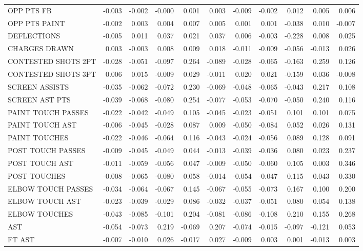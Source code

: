 \begin{tabular}{lrrrrrrrrrr}
OPP PTS FB & -0.003 & -0.002 & -0.000 & 0.001 & 0.003 & -0.009 & -0.002 & 0.012 & 0.005 & 0.006 \\
OPP PTS PAINT & -0.002 & 0.003 & 0.004 & 0.007 & 0.005 & 0.001 & 0.001 & -0.038 & 0.010 & -0.007 \\
DEFLECTIONS & -0.005 & 0.011 & 0.037 & 0.021 & 0.037 & 0.006 & -0.003 & -0.228 & 0.008 & 0.025 \\
CHARGES DRAWN & 0.003 & -0.003 & 0.008 & 0.009 & 0.018 & -0.011 & -0.009 & -0.056 & -0.013 & 0.026 \\
CONTESTED SHOTS 2PT & -0.028 & -0.051 & -0.097 & 0.264 & -0.089 & -0.028 & -0.065 & -0.163 & 0.259 & 0.126 \\
CONTESTED SHOTS 3PT & 0.006 & 0.015 & -0.009 & 0.029 & -0.011 & 0.020 & 0.021 & -0.159 & 0.036 & -0.008 \\
SCREEN ASSISTS & -0.035 & -0.062 & -0.072 & 0.230 & -0.069 & -0.048 & -0.065 & -0.043 & 0.217 & 0.108 \\
SCREEN AST PTS & -0.039 & -0.068 & -0.080 & 0.254 & -0.077 & -0.053 & -0.070 & -0.050 & 0.240 & 0.116 \\
PAINT TOUCH PASSES & -0.022 & -0.042 & -0.049 & 0.105 & -0.045 & -0.023 & -0.051 & 0.101 & 0.101 & 0.075 \\
PAINT TOUCH AST & -0.006 & -0.045 & -0.028 & 0.087 & 0.009 & -0.050 & -0.084 & 0.052 & 0.026 & 0.131 \\
PAINT TOUCHES & -0.022 & -0.046 & -0.064 & 0.116 & -0.043 & -0.024 & -0.056 & 0.089 & 0.128 & 0.091 \\
POST TOUCH PASSES & -0.009 & -0.045 & -0.049 & 0.044 & -0.013 & -0.039 & -0.036 & 0.080 & 0.023 & 0.237 \\
POST TOUCH AST & -0.011 & -0.059 & -0.056 & 0.047 & -0.009 & -0.050 & -0.060 & 0.105 & 0.003 & 0.346 \\
POST TOUCHES & -0.008 & -0.065 & -0.080 & 0.058 & -0.014 & -0.054 & -0.047 & 0.115 & 0.043 & 0.330 \\
ELBOW TOUCH PASSES & -0.034 & -0.064 & -0.067 & 0.145 & -0.067 & -0.055 & -0.073 & 0.167 & 0.100 & 0.200 \\
ELBOW TOUCH AST & -0.023 & -0.039 & -0.029 & 0.086 & -0.032 & -0.037 & -0.051 & 0.080 & 0.054 & 0.138 \\
ELBOW TOUCHES & -0.043 & -0.085 & -0.101 & 0.204 & -0.081 & -0.086 & -0.108 & 0.210 & 0.155 & 0.268 \\
AST & -0.054 & -0.073 & 0.219 & -0.069 & 0.207 & -0.074 & -0.015 & -0.097 & -0.121 & 0.053 \\
FT AST & -0.007 & -0.010 & 0.026 & -0.017 & 0.027 & -0.009 & 0.003 & 0.001 & -0.013 & 0.003 \\

\end{tabular}
